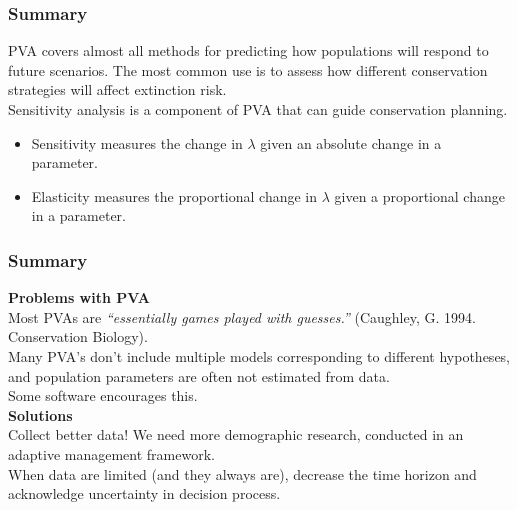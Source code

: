 \documentclass[color=usenames,dvipsnames]{beamer}\usepackage[]{graphicx}\usepackage[]{xcolor}
\begin{document}
\begin{frame}
  \frametitle{Summary}
  PVA covers almost all methods for predicting how populations will
  respond to future scenarios.
  \pause
  \vfill
  The most common use is to assess how different conservation
  strategies will affect extinction risk. \\
  \pause
  \vfill
  Sensitivity analysis is a component of PVA that can guide
  conservation planning. \\
  \pause
  \begin{itemize}
    \item Sensitivity measures the change in $\lambda$ given an absolute
      change in a parameter.
    \item Elasticity measures the proportional change in $\lambda$ given a
      proportional change in a parameter.
  \end{itemize}
\end{frame}


\begin{frame}
  \frametitle{Summary}
  {\bf Problems with PVA} \\
  Most PVAs are {\it ``essentially games played with
    guesses.''} (Caughley, G. 1994. Conservation Biology). \\
  \pause
  \vspace{12pt}
  Many PVA's don't include multiple models corresponding to different
  hypotheses, and population parameters are often not estimated from
  data. \\ 
  \pause
  \vspace{12pt}
  Some software encourages this. \\
  \pause
  \vfill
  {\bf Solutions } \\
  Collect better data! We need more demographic research, conducted in
  an adaptive management framework. \\
  \pause
  \vspace{12pt}
  When data are limited (and they always are), decrease the time
  horizon and acknowledge uncertainty in decision process.  
\end{frame}




\end{document}
